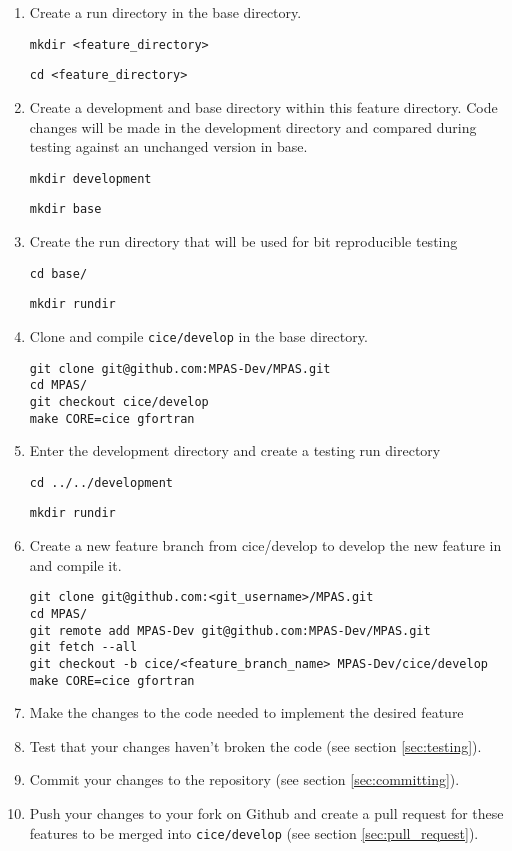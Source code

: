 \documentclass{article}
\begin{document}
\begin{enumerate}

\item Create a run directory in the base directory.

\verb+mkdir <feature_directory>+

\verb+cd <feature_directory>+

\item Create a development and base directory within this feature directory. Code changes will be made in the development directory and compared during testing against an unchanged version in base.

\verb+mkdir development+

\verb+mkdir base+

\item Create the run directory that will be used for bit reproducible testing

\verb+cd base/+

\verb+mkdir rundir+

\item Clone and compile \verb+cice/develop+ in the base directory.
\begin{verbatim}
git clone git@github.com:MPAS-Dev/MPAS.git
cd MPAS/
git checkout cice/develop
make CORE=cice gfortran
\end{verbatim}

\item Enter the development directory and create a testing run directory

\verb+cd ../../development+

\verb+mkdir rundir+


\item Create a new feature branch from cice/develop to develop the new feature in and compile it.
\begin{verbatim}
git clone git@github.com:<git_username>/MPAS.git
cd MPAS/
git remote add MPAS-Dev git@github.com:MPAS-Dev/MPAS.git
git fetch --all
git checkout -b cice/<feature_branch_name> MPAS-Dev/cice/develop
make CORE=cice gfortran
\end{verbatim}
 
\item Make the changes to the code needed to implement the desired feature

\item Test that your changes haven't broken the code (see section \ref{sec:testing}).

\item Commit your changes to the repository (see section \ref{sec:committing}).

\item Push your changes to your fork on Github and create a pull request for these features to be merged into \verb+cice/develop+ (see section \ref{sec:pull_request}).
  
\end{enumerate}
\end{document}
